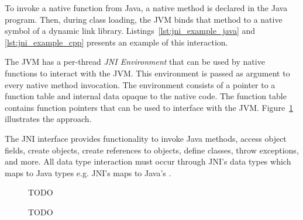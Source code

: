 To invoke a native function from Java, a native method is declared in the Java program. Then, during class loading, the JVM binds that method to a native symbol of a dynamic link library. Listings~\ref{lst:jni_example_java} and \ref{lst:jni_example_cpp} presents an example of this interaction.

\begin{figure}[b]
\par\noindent\begin{minipage}[t]{.45\textwidth}

\end{minipage}\hfill
\begin{minipage}[t]{.5\textwidth}

\end{minipage}
\caption*{} %
\end{figure}

The JVM has a per-thread \emph{JNI Environment} that can be used by native functions to interact with the JVM. This environment is passed as argument to every native method invocation. The environment consists of a pointer to a function table and internal data opaque to the native code. The function table contains function pointers that can be used to interface with the JVM. Figure~\ref{fig:jni_function_table} illustrates the approach.

The JNI interface provides functionality to invoke Java methods, access object fields, create objects, create references to objects, define classes, throw exceptions, and more. All data type interaction must occur through JNI's data types which maps to Java types e.g. JNI's  maps to Java's .

\begin{figure}[h]
\caption{TODO}
\label{fig:jni_function_table}
TODO
\end{figure}





